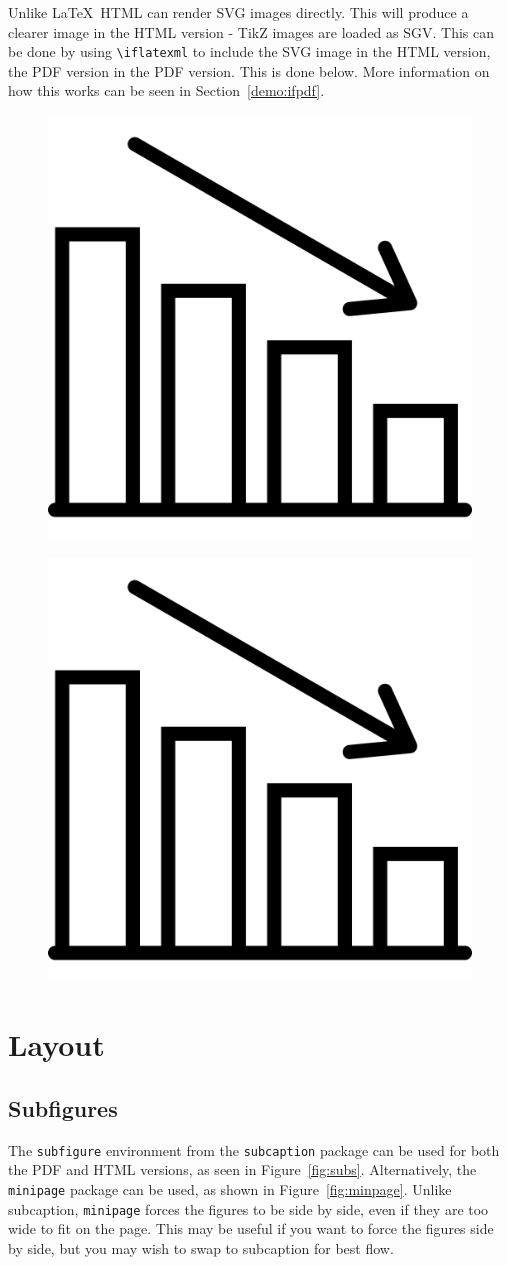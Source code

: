 Unlike \LaTeX\, HTML can render SVG images directly. This will produce a clearer image in the HTML version - TikZ images are loaded as SGV. This can be done by using \verb|\iflatexml| to include the SVG image in the HTML version, the PDF version in the PDF version. This is done below. More information on how this works can be seen in Section~\ref{demo:ifpdf}.


\iflatexml
\begin{figure}[H]
    \centering
    \includegraphics[width=0.25\linewidth, alt={Generic bar graphic chart with an arrow to indicate downward trend}]{img/graph.svg}
    \label{fig:graph}
\end{figure}
\else
\begin{figure}[H]
    \centering
    \includegraphics[width=0.25\linewidth, alt={Generic bar chart with an arrow to indicate downward trend}]{img/graph.pdf}
    \label{fig:graph}
\end{figure}
\fi

\section{Layout}

\subsection{Subfigures}
\label{demo:fig:subfig}

The \verb|subfigure| environment from the \verb|subcaption| package can be used for both the PDF and HTML versions, as seen in Figure~\ref{fig:subs}. Alternatively, the \verb|minipage| package can be used, as shown in Figure~\ref{fig:minpage}. Unlike subcaption, \verb|minipage| forces the figures to be side by side, even if they are too wide to fit on the page. This may be useful if you want to force the figures side by side, but you may wish to swap to subcaption for best flow. 

